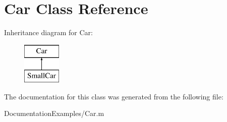 \hypertarget{class_car}{}\section{Car Class Reference}
\label{class_car}
Inheritance diagram for Car\+:\begin{figure}[H]
\begin{center}
\leavevmode
\includegraphics[height=2.000000cm]{d6/d44/class_car}
\end{center}
\end{figure}


The documentation for this class was generated from the following file\+:\begin{DoxyCompactItemize}
\item 
Documentation\+Examples/Car.\+m\end{DoxyCompactItemize}
